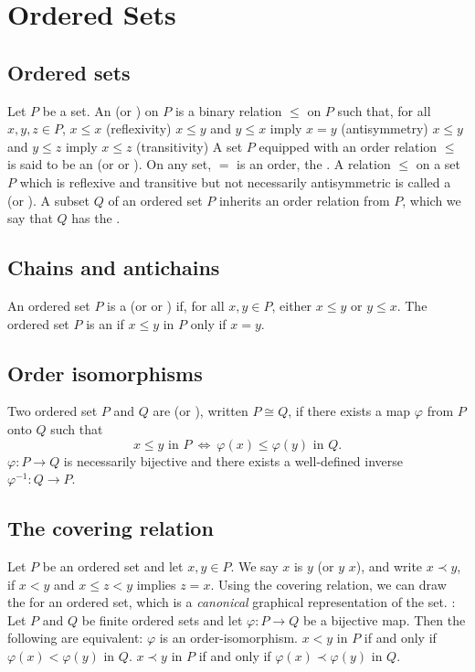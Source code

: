 \documentclass{myproc}
\def\sbf{\bfseries}
\begin{document}
\small
\pagestyle{empty}


\section{Ordered Sets}
\subsection{Ordered sets}
\bit
\w Let $P$ be a set. An  (or ) on $P$ is a binary
relation $\le$ on $P$ such that, for all $x, y, z \in P$,
 \ben
 \w [(a)] $x \le x$ \hfill (reflexivity)
 \w [(b)] $x \le y$ and $y \le x$ imply $x = y$ \hfill (antisymmetry)
 \w [(c)] $x \le y$ and $y \le z$ imply $x \le z$ \hfill (transitivity)
 \een
\w A set $P$ equipped with an order relation $\le$ is said to be an 
  (or  or ).
\w On any set, $=$ is an order, the .
\w A relation $\le$ on a set $P$ which is reflexive and transitive but not
necessarily antisymmetric is called a  (or ).
\w A subset $Q$ of an ordered set $P$ inherits an order relation from $P$,
which we say that $Q$ has the .
\eit
\subsection{Chains and antichains}
\bit
\w An ordered set $P$ is a  (or  or
) if, for all $x, y \in P$, either $x \le
y$ or $y \le x$.
\w The ordered set $P$ is an  if $x \le y$ in $P$ only if
 $x = y$.
\eit
\subsection{Order isomorphisms}
\bit
\w Two ordered set $P$ and $Q$ are  (or ),
written $P \cong Q$, if there exists a map $\varphi$ from $P$ onto $Q$
such that 
 \[ x \le y \mbox{\ in\ } P \ \Leftrightarrow\ \varphi(x) \le \varphi(y)
 \mbox{\ in\ } Q.\]
\w $\varphi: P \rightarrow Q$ is necessarily bijective and there exists a
well-defined inverse $\varphi^{-1}: Q \rightarrow P$.
\eit

\subsection{The covering relation}
\bit
\w Let $P$ be an ordered set and let $x, y \in P$. We say $x$ is  $y$ (or $y$  $x$), and write $x \prec y$, if $x < y$ and $x
\le z < y$ implies $z = x$.
\w Using the covering relation, we can draw the  for an
  ordered set, which is a {\em canonical\/} graphical representation of the set.
\w {\sbf Lemma}: Let $P$ and $Q$ be finite ordered sets and let $\varphi: P
\rightarrow Q$ be a bijective map. Then the following are equivalent:
 \ben
 \w [(a)] $\varphi$ is an order-isomorphism.
 \w [(b)] $x < y$ in $P$ if and only if $\varphi(x) < \varphi(y)$ in $Q$.
 \w [(c)] $x \prec y$ in $P$ if and only if 
      $\varphi(x) \prec \varphi(y)$ in $Q$.
 \een
\eit
\end{document}
